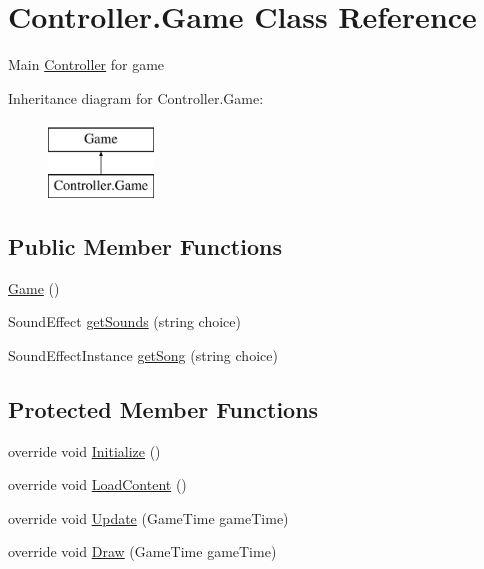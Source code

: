 \hypertarget{class_controller_1_1_game}{}\section{Controller.\+Game Class Reference}
\label{class_controller_1_1_game}


Main \hyperlink{namespace_controller}{Controller} for game  


Inheritance diagram for Controller.\+Game\+:\begin{figure}[H]
\begin{center}
\leavevmode
\includegraphics[height=2.000000cm]{class_controller_1_1_game}
\end{center}
\end{figure}
\subsection*{Public Member Functions}
\begin{DoxyCompactItemize}
\item 
\hyperlink{class_controller_1_1_game_a93f1824d202daf7132b24039b97eaa7a}{Game} ()
\item 
Sound\+Effect \hyperlink{class_controller_1_1_game_ab177e0ab61ac7144e08b20c6835c2c7c}{get\+Sounds} (string choice)
\item 
Sound\+Effect\+Instance \hyperlink{class_controller_1_1_game_a2bc0cb0de0a3bb75b54c27b482870ca0}{get\+Song} (string choice)
\end{DoxyCompactItemize}
\subsection*{Protected Member Functions}
\begin{DoxyCompactItemize}
\item 
override void \hyperlink{class_controller_1_1_game_aa3a270df3da66d794d8607e029bf9608}{Initialize} ()
\item 
override void \hyperlink{class_controller_1_1_game_a05c5bf033337a7f5130735e218772770}{Load\+Content} ()
\item 
override void \hyperlink{class_controller_1_1_game_a57f4f23e2ca97a9ed820aab106a2ebe3}{Update} (Game\+Time game\+Time)
\item 
override void \hyperlink{class_controller_1_1_game_a243addf184836c81e6a4f793b0ba0a9f}{Draw} (Game\+Time game\+Time)
\end{DoxyCompactItemize}
